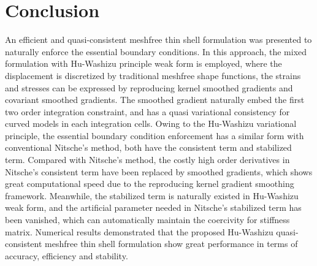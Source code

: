 \section{Conclusion}\label{conclusion}
An efficient and quasi-consistent meshfree thin shell formulation was presented to naturally enforce the essential boundary conditions. In this approach, the mixed formulation with Hu-Washizu principle weak form is employed, where the displacement is discretized by traditional meshfree shape functions, the strains and stresses can be expressed by reproducing kernel smoothed gradients and covariant smoothed gradients. The smoothed gradient naturally embed the first two order integration constraint, and has a quasi variational consistency for curved models in each integration cells. Owing to the Hu-Washizu variational principle, the essential boundary condition enforcement has a similar form with conventional Nitsche's method, both have the consistent term and stabilized term. Compared with Nitsche's method, the costly high order derivatives in Nitsche's consistent term have been replaced by smoothed gradients, which shows great computational speed due to the reproducing kernel gradient smoothing framework. Meanwhile, the stabilized term is naturally existed in Hu-Washizu weak form, and the artificial parameter needed in Nitsche's stabilized term has been vanished, which can automatically maintain the coercivity for stiffness matrix. Numerical results demonstrated that the proposed Hu-Washizu quasi-consistent meshfree thin shell formulation show great performance in terms of accuracy, efficiency and stability.

